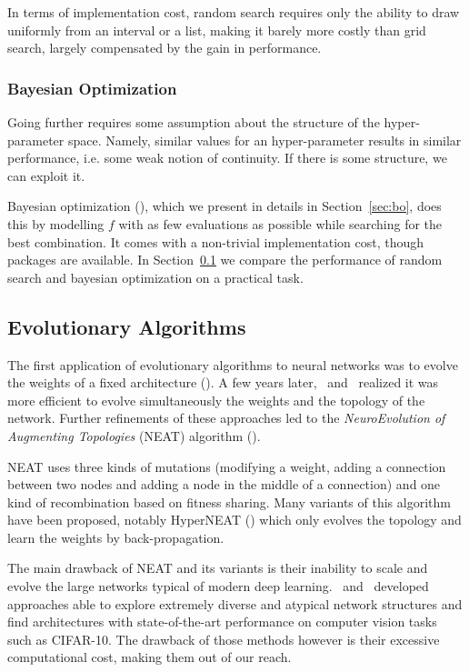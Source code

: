 In terms of implementation cost, random search requires only the ability to draw uniformly from an interval or a list, making it barely more costly than grid search, largely compensated by the gain in performance.

\subsubsection{Bayesian Optimization}

Going further requires some assumption about the structure of the hyper-parameter space. Namely, similar values for an hyper-parameter results in similar performance, i.e. some weak notion of continuity. If there is some structure, we can exploit it.

Bayesian optimization (\textcite{bergstra2011NIPS}), which we present in details in Section~\ref{sec:bo}, does this by modelling $f$ with as few evaluations as possible while searching for the best combination. It comes with a non-trivial implementation cost, though packages are available. In Section~\ref{} we compare the performance of random search and bayesian optimization on a practical task.

\subsection{Evolutionary Algorithms}

The first application of evolutionary algorithms to neural networks was to evolve the weights of a fixed architecture (\textcite{miller1989}). A few years later,~\textcite{braun1993} and~\textcite{angeline1994} realized it was more efficient to evolve simultaneously the weights and the topology of the network. Further refinements of these approaches led to the \textit{NeuroEvolution of Augmenting Topologies} (NEAT) algorithm (\textcite{stanley2002EC}). 

NEAT uses three kinds of mutations (modifying a weight, adding a connection between two nodes and adding a node in the middle of a connection) and one kind of recombination based on fitness sharing. Many variants of this algorithm have been proposed, notably HyperNEAT (\textcite{stanley2009}) which only evolves the topology and learn the weights by back-propagation. 

The main drawback of NEAT and its variants is their inability to scale and evolve the large networks typical of modern deep learning.~\textcite{real2017ICML} and~\textcite{miikkulainen2017} developed approaches able to explore extremely diverse and atypical network structures and find architectures with state-of-the-art performance on computer vision tasks such as CIFAR-10. The drawback of those methods however is their excessive computational cost, making them out of our reach.

